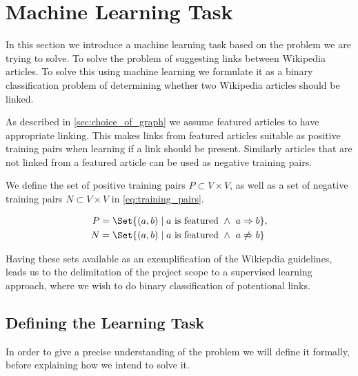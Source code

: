 \section{Machine Learning Task}\label{sec:machine_learning_task}
In this section we introduce a machine learning task based on the problem we are trying to solve. To solve the problem of suggesting links between Wikipedia articles. To solve this using machine learning we formulate it as a binary classification problem of determining whether two Wikipedia articles should be linked.

As described in \cref{sec:choice_of_graph} we assume featured articles to have appropriate linking. This makes links from featured articles suitable as positive training pairs when learning if a link should be present. Similarly articles that are not linked from a featured article can be used as negative training pairs.

We define the set of positive training pairs $P \subset V \times V$, as well as a set of negative training pairs $N \subset V \times V$ in \cref{eq:training_pairs}.

\begin{equation}
\label{eq:training_pairs}
  \begin{split}
    P &= \Set{(a,b) \mid a\text{ is featured}\ \wedge\ a \Rightarrow b}, \\
    N &= \Set{(a,b) \mid a\text{ is featured}\ \wedge\ a \not\Rightarrow b}
  \end{split}
\end{equation}

Having these sets available as an exemplification of the Wikiepdia guidelines, leads us to the delimitation of the project scope to a supervised learning approach, where we wish to do binary classification of potentional links.


\subsection{Defining the Learning Task}
\label{sec:ml_def}
In order to give a precise understanding of the problem we will define it formally, before explaining how we intend to solve it.


